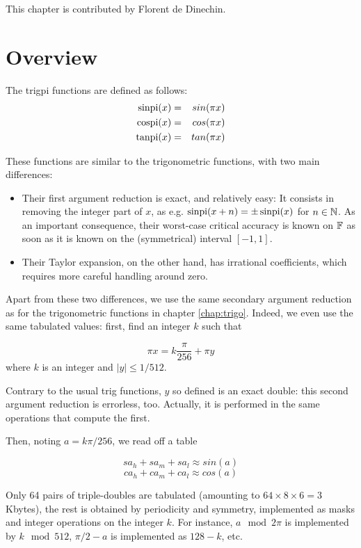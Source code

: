 This chapter is contributed by Florent de Dinechin.


\section{Overview}
The trigpi functions are defined as follows:
\begin{eqnarray}
 \operatorname{sinpi}(x) &=& sin(\pi x) \\
 \operatorname{cospi}(x) &=& cos(\pi x) \\
 \operatorname{tanpi}(x) &=& tan(\pi x)  
\end{eqnarray}

These functions are similar to the trigonometric functions, with
two main differences:
\begin{itemize}
\item Their first argument reduction is exact, and relatively easy: It
  consists in removing the integer part of $x$, as e.g.
  $\operatorname{sinpi}(x+n)=\pm \operatorname{sinpi}(x)$ for $n\in\mathbb {N}$. As an important consequence, their
  worst-case critical accuracy is known on $\mathbb {F}$ as soon as it is known
  on  the (symmetrical) interval $[-1, 1]$.
\item Their Taylor expansion, on the other hand, has irrational
  coefficients, which requires more careful handling around zero.
\end{itemize}

Apart from these two differences, we use the same secondary argument
reduction as for the trigonometric functions in chapter
\ref{chap:trigo}. Indeed, we even use the same tabulated values: first, find an integer $k$ such that

\begin{equation}
  \pi x = k\frac{\pi}{256} + \pi y\label{eq:trigpiargred}
\end{equation}
where $k$ is an integer and  $ |y| \leq {1}/{512}$.

Contrary to the usual trig functions, $y$ so defined is an exact
double: this second argument reduction is errorless, too. Actually, it
is performed in the same operations that compute the first.

Then, noting $a=k\pi/256$, 
we read off a table 

$$sa_h+sa_m+sa_l \approx sin(a)$$
$$ca_h+ca_m+ca_l \approx cos(a)$$

Only 64 pairs of triple-doubles  are tabulated (amounting to
$64\times 8 \times 6 = 3$ Kbytes), the rest is obtained by
periodicity and symmetry, implemented as masks and integer operations
on the integer $k$. For instance,  $a \mod 2\pi$ is implemented by $k \mod 512$,
$\pi/2-a$ is implemented as $128-k$, etc.


